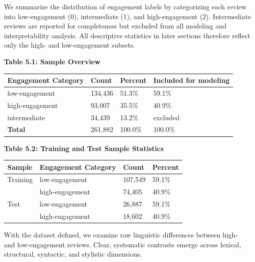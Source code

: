 \documentclass[
]{article}
\begin{document}
We summarize the distribution of engagement labels by categorizing each
review into low‑engagement (0), intermediate (1), and high‑engagement
(2). Intermediate reviews are reported for completeness but excluded
from all modeling and interpretability analysis. All descriptive
statistics in later sections therefore reflect only the high‑ and
low‑engagement subsets.

\textbf{Table 5.1: Sample Overview}

\begin{longtable}[]{@{}llll@{}}
\toprule()
Engagement Category & Count & Percent & Included for modeling \\
\midrule()
\endhead
low-engagement & 134,436 & 51.3\% & 59.1\% \\
high-engagement & 93,007 & 35.5\% & 40.9\% \\
intermediate & 34,439 & 13.2\% & excluded \\
\textbf{Total} & 261,882 & 100.0\% & 100.0\% \\
\bottomrule()
\end{longtable}

\textbf{Table 5.2: Training and Test Sample Statistics}

\begin{longtable}[]{@{}llll@{}}
\toprule()
Sample & Engagement Category & Count & Percent \\
\midrule()
\endhead
Training & low-engagement & 107,549 & 59.1\% \\
& high-engagement & 74,405 & 40.9\% \\
Test & low-engagement & 26,887 & 59.1\% \\
& high-engagement & 18,602 & 40.9\% \\
\bottomrule()
\end{longtable}

With the dataset defined, we examine raw linguistic differences between
high‑ and low‑engagement reviews. Clear, systematic contrasts emerge
across lexical, structural, syntactic, and stylistic dimensions.
\end{document}
